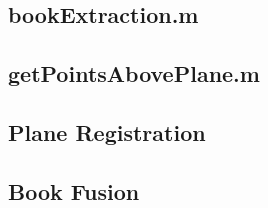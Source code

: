 \subsection{bookExtraction.m}


\subsection{getPointsAbovePlane.m}




\subsection{Plane Registration}



\subsection{Book Fusion}
%